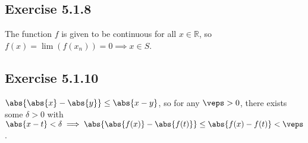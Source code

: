 \documentclass[11pt]{article}
\newcommand{\R}{\mathbb{R}}  %
\begin{document}
    \subsection*{Exercise 5.1.8}
    The function $f$ is given to be continuous for all $x\in\R$, so $f(x)=\lim(f(x_n))=0 \implies x\in S$.

    \subsection*{Exercise 5.1.10}
    $\abs{\abs{x}-\abs{y}}\leq \abs{x-y}$, so for any $\veps > 0$, there exists some $\delta >0$ with $\abs{x-t}<\delta\implies \abs{\abs{f(x)}-\abs{f(t)}}\leq\abs{f(x)-f(t)}<\veps$.
\end{document}
